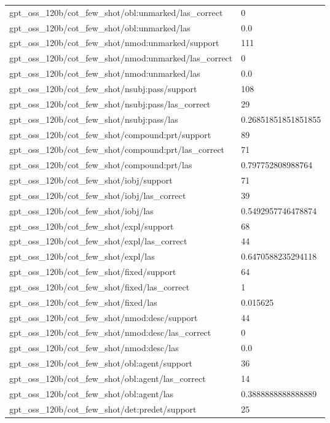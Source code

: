 \begin{tabular}{ll}
gpt\_oss\_120b/cot\_few\_shot/obl:unmarked/las\_correct & 0 \\
gpt\_oss\_120b/cot\_few\_shot/obl:unmarked/las & 0.0 \\
gpt\_oss\_120b/cot\_few\_shot/nmod:unmarked/support & 111 \\
gpt\_oss\_120b/cot\_few\_shot/nmod:unmarked/las\_correct & 0 \\
gpt\_oss\_120b/cot\_few\_shot/nmod:unmarked/las & 0.0 \\
gpt\_oss\_120b/cot\_few\_shot/nsubj:pass/support & 108 \\
gpt\_oss\_120b/cot\_few\_shot/nsubj:pass/las\_correct & 29 \\
gpt\_oss\_120b/cot\_few\_shot/nsubj:pass/las & 0.26851851851851855 \\
gpt\_oss\_120b/cot\_few\_shot/compound:prt/support & 89 \\
gpt\_oss\_120b/cot\_few\_shot/compound:prt/las\_correct & 71 \\
gpt\_oss\_120b/cot\_few\_shot/compound:prt/las & 0.797752808988764 \\
gpt\_oss\_120b/cot\_few\_shot/iobj/support & 71 \\
gpt\_oss\_120b/cot\_few\_shot/iobj/las\_correct & 39 \\
gpt\_oss\_120b/cot\_few\_shot/iobj/las & 0.5492957746478874 \\
gpt\_oss\_120b/cot\_few\_shot/expl/support & 68 \\
gpt\_oss\_120b/cot\_few\_shot/expl/las\_correct & 44 \\
gpt\_oss\_120b/cot\_few\_shot/expl/las & 0.6470588235294118 \\
gpt\_oss\_120b/cot\_few\_shot/fixed/support & 64 \\
gpt\_oss\_120b/cot\_few\_shot/fixed/las\_correct & 1 \\
gpt\_oss\_120b/cot\_few\_shot/fixed/las & 0.015625 \\
gpt\_oss\_120b/cot\_few\_shot/nmod:desc/support & 44 \\
gpt\_oss\_120b/cot\_few\_shot/nmod:desc/las\_correct & 0 \\
gpt\_oss\_120b/cot\_few\_shot/nmod:desc/las & 0.0 \\
gpt\_oss\_120b/cot\_few\_shot/obl:agent/support & 36 \\
gpt\_oss\_120b/cot\_few\_shot/obl:agent/las\_correct & 14 \\
gpt\_oss\_120b/cot\_few\_shot/obl:agent/las & 0.3888888888888889 \\
gpt\_oss\_120b/cot\_few\_shot/det:predet/support & 25 \\

\end{tabular}
